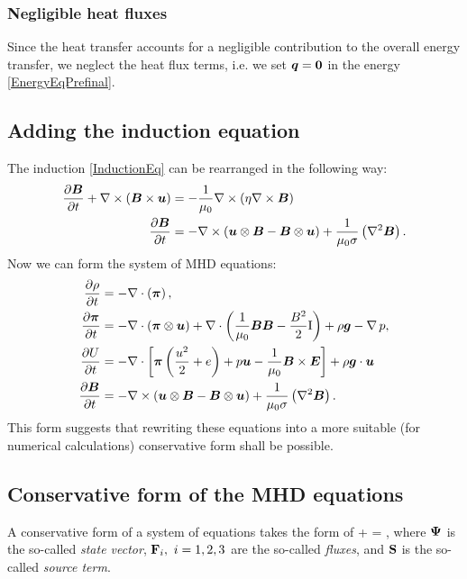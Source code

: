 \subsubsection{Negligible heat fluxes}
Since the heat transfer accounts for a negligible contribution to the overall energy transfer, we neglect the heat flux terms, i.e. we set $\mbox{\boldmath $q$} = \mathbf{0}$ in the energy \cref{EnergyEqPrefinal}.

\subsection{Adding the induction equation}
The induction \cref{InductionEq} can be rearranged in the following way:
\begin{align}
\frac{\partial{\mbox{\boldmath $B$}}}{\partial{t}} + \nabla \times \left( \mbox{\boldmath $B$} \times \mbox{\boldmath $u$} \right) & =  -\frac{1}{\mu_0} \nabla \times \left( \eta \nabla \times \mbox{\boldmath $B$} \right)\\
\label{InductionPreFinal} \frac{\partial{\mbox{\boldmath $B$}}}{\partial{t}} & =  - \nabla \times \left( \mbox{\boldmath $u$} \otimes \mbox{\boldmath $B$} - \mbox{\boldmath $B$} \otimes \mbox{\boldmath $u$} \right) + \frac{1}{\mu_{0}\sigma} \left( \nabla^2 \mbox{\boldmath $B$} \right).
\end{align}
Now we can form the system of MHD equations:
\begin{align}
\label{ContinuityEqFinal} \frac{\partial{\rho}}{\partial{t}} & =  - \nabla\cdot\left(\mbox{\boldmath $\pi$}\right),\\
\label{NSEqFinal} \frac{\partial{\mbox{\boldmath $\pi$}}}{\partial{t}} & =  - \nabla\cdot\left(\mbox{\boldmath $\pi$}\otimes\mbox{\boldmath $u$}\right) + \nabla\cdot\left(\frac{1}{\mu_0}\mbox{\boldmath $B$}\mbox{\boldmath $B$} - \frac{B^2}{2}\mathrm{I}\right) + \rho\mbox{\boldmath $g$} - \nabla\,p,\\
\label{EnergyEqFinal} \frac{\partial{U}}{\partial{t}} & =  -\nabla\cdot\left[\mbox{\boldmath $\pi$}\left( \frac{u^2}{2} + e\right) + p \mbox{\boldmath $u$} - \frac{1}{\mu_0}\mbox{\boldmath $B$}\times\mbox{\boldmath $E$}\right] + \rho \mbox{\boldmath $g$} \cdot \mbox{\boldmath $u$}\\
\label{InductionFinal} \frac{\partial{\mbox{\boldmath $B$}}}{\partial{t}} & =  - \nabla \times \left( \mbox{\boldmath $u$} \otimes \mbox{\boldmath $B$} - \mbox{\boldmath $B$} \otimes \mbox{\boldmath $u$} \right) + \frac{1}{\mu_{0}\sigma} \left( \nabla^2 \mbox{\boldmath $B$} \right).
\end{align}
This form suggests that rewriting these equations into a more suitable (for numerical calculations) conservative form shall be possible.
\subsection{Conservative form of the MHD equations}
A conservative form of a system of equations takes the form of
\be
\label{conservativeGeneric}  + \nabla \cdot \mrF\lo\mrPsi\ro = \mrS,
\ee
where $\mathrm{\mathbf{\Psi}}$ is the so-called \textit{state vector}, $\mathrm{\mathbf{F}}_i,\ i = 1, 2, 3$ are the so-called \textit{fluxes}, and $\mathrm{\mathbf{S}}$ is the so-called \textit{source term}.
